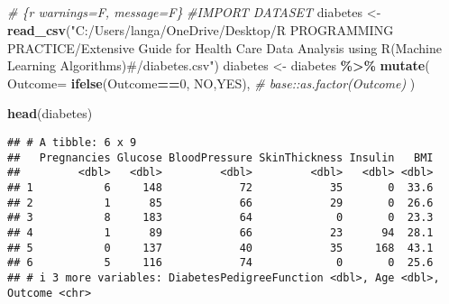 \documentclass[
]{article}
\newenvironment{Shaded}{\begin{snugshade}}{\end{snugshade}}
\newcommand{\AttributeTok}[1]{\textcolor[rgb]{0.13,0.29,0.53}{#1}}
\newcommand{\CommentTok}[1]{\textcolor[rgb]{0.56,0.35,0.01}{\textit{#1}}}
\newcommand{\DecValTok}[1]{\textcolor[rgb]{0.00,0.00,0.81}{#1}}
\newcommand{\FunctionTok}[1]{\textcolor[rgb]{0.13,0.29,0.53}{\textbf{#1}}}
\newcommand{\NormalTok}[1]{#1}
\newcommand{\OtherTok}[1]{\textcolor[rgb]{0.56,0.35,0.01}{#1}}
\newcommand{\SpecialCharTok}[1]{\textcolor[rgb]{0.81,0.36,0.00}{\textbf{#1}}}
\newcommand{\StringTok}[1]{\textcolor[rgb]{0.31,0.60,0.02}{#1}}
\begin{document}
\hypertarget{section}{%
\subsection{}\label{section}}

\begin{Shaded}
\begin{Highlighting}[]
\CommentTok{\# \{r warnings=F, message=F\}}
\CommentTok{\#IMPORT DATASET}
\NormalTok{diabetes }\OtherTok{\textless{}{-}} \FunctionTok{read\_csv}\NormalTok{(}\StringTok{"C:/Users/langa/OneDrive/Desktop/R PROGRAMMING PRACTICE/Extensive Guide for Health Care Data Analysis using R(Machine Learning Algorithms)\#/diabetes.csv"}\NormalTok{)}
\NormalTok{diabetes }\OtherTok{\textless{}{-}}\NormalTok{ diabetes }\SpecialCharTok{\%\textgreater{}\%} 
     \FunctionTok{mutate}\NormalTok{(}
       \AttributeTok{Outcome=} \FunctionTok{ifelse}\NormalTok{(Outcome}\SpecialCharTok{==}\DecValTok{0}\NormalTok{, }\StringTok{\textquotesingle{}NO\textquotesingle{}}\NormalTok{,}\StringTok{\textquotesingle{}YES\textquotesingle{}}\NormalTok{), }
                    \CommentTok{\# base::as.factor(Outcome)}
\NormalTok{                           )}

\FunctionTok{head}\NormalTok{(diabetes)}
\end{Highlighting}
\end{Shaded}

\begin{verbatim}
## # A tibble: 6 x 9
##   Pregnancies Glucose BloodPressure SkinThickness Insulin   BMI
##         <dbl>   <dbl>         <dbl>         <dbl>   <dbl> <dbl>
## 1           6     148            72            35       0  33.6
## 2           1      85            66            29       0  26.6
## 3           8     183            64             0       0  23.3
## 4           1      89            66            23      94  28.1
## 5           0     137            40            35     168  43.1
## 6           5     116            74             0       0  25.6
## # i 3 more variables: DiabetesPedigreeFunction <dbl>, Age <dbl>, Outcome <chr>
\end{verbatim}

\begin{Shaded}
\end{Shaded}
\end{document}
